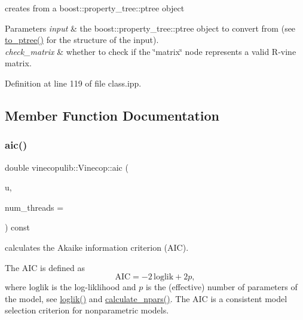 creates from a boost\+::property\+\_\+tree\+::ptree object 


\begin{DoxyParams}{Parameters}
{\em input} & the boost\+::property\+\_\+tree\+::ptree object to convert from (see \hyperlink{classvinecopulib_1_1_vinecop_aaee91f92acc8402eb7358b65c8fe63f8}{to\+\_\+ptree()} for the structure of the input). \\
\hline
{\em check\+\_\+matrix} & whether to check if the {\ttfamily \char`\"{}matrix\char`\"{}} node represents a valid R-\/vine matrix. \\
\hline
\end{DoxyParams}


Definition at line 119 of file class.\+ipp.



\subsection{Member Function Documentation}
\mbox{\label{classvinecopulib_1_1_vinecop_a082d0c740fcb5610c8d7687cf12a95e4}} 
\subsubsection{\texorpdfstring{aic()}{aic()}}
{\footnotesize\ttfamily double vinecopulib\+::\+Vinecop\+::aic (\begin{DoxyParamCaption}\item[{const Eigen\+::\+Matrix\+Xd \&}]{u,  }\item[{const size\+\_\+t}]{num\+\_\+threads = {} }\end{DoxyParamCaption}) const\hspace{0.3cm}{\ttfamily [inline]}}



calculates the Akaike information criterion (A\+IC). 

The A\+IC is defined as \[ \mathrm{AIC} = -2\, \mathrm{loglik} + 2 p, \] where $ \mathrm{loglik} $ is the log-\/liklihood and $ p $ is the (effective) number of parameters of the model, see \hyperlink{classvinecopulib_1_1_vinecop_a07e9c59b42d0668df5fc5e69b281272e}{loglik()} and \hyperlink{classvinecopulib_1_1_vinecop_a2b4b1151c5b0a817811628aa59de7eea}{calculate\+\_\+npars()}. The A\+IC is a consistent model selection criterion for nonparametric models.


